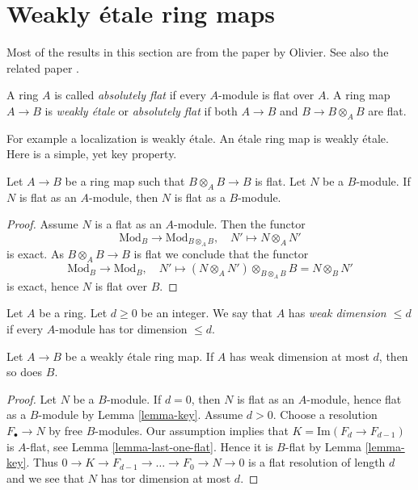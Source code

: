 \section{Weakly \'etale ring maps}
\label{section-weakly-etale}

\noindent
Most of the results in this section are from the paper
\cite{Olivier-AF} by Olivier. See also the related paper
\cite{Ferrand-epi}.

\begin{definition}
\label{definition-weakly-etale}
A ring $A$ is called {\it absolutely flat} if every $A$-module is flat over
$A$. A ring map $A \to B$ is {\it weakly \'etale} or {\it absolutely flat}
if both $A \to B$ and $B \to B \otimes_A B$ are flat.
\end{definition}

\noindent
For example a localization is weakly \'etale. An \'etale ring map is weakly
\'etale. Here is a simple, yet key property.

\begin{lemma}
\label{lemma-key}
Let $A \to B$ be a ring map such that $B \otimes_A B \to B$ is flat.
Let $N$ be a $B$-module. If $N$ is flat as an $A$-module, then
$N$ is flat as a $B$-module.
\end{lemma}

\begin{proof}
Assume $N$ is a flat as an $A$-module.
Then the functor
$$
\text{Mod}_B \longrightarrow \text{Mod}_{B \otimes_A B},\quad
N' \mapsto N \otimes_A N'
$$
is exact. As $B \otimes_A B \to B$ is flat we conclude that the functor
$$
\text{Mod}_B \longrightarrow \text{Mod}_B,\quad
N' \mapsto (N \otimes_A N') \otimes_{B \otimes_A B} B = N \otimes_B N'
$$
is exact, hence $N$ is flat over $B$.
\end{proof}

\begin{definition}
\label{definition-weak-dimension}
Let $A$ be a ring. Let $d \geq 0$ be an integer.
We say that $A$ has {\it weak dimension $\leq d$}
if every $A$-module has tor dimension $\leq d$.
\end{definition}

\begin{lemma}
\label{lemma-weak-dimension-goes-up}
Let $A \to B$ be a weakly \'etale ring map.
If $A$ has weak dimension at most $d$, then so does $B$.
\end{lemma}

\begin{proof}
Let $N$ be a $B$-module. If $d = 0$, then $N$ is flat as an $A$-module,
hence flat as a $B$-module by Lemma \ref{lemma-key}.
Assume $d > 0$. Choose a resolution $F_\bullet \to N$
by free $B$-modules. Our assumption implies that
$K = \text{Im}(F_d \to F_{d - 1})$ is $A$-flat, see
Lemma \ref{lemma-last-one-flat}. Hence it is $B$-flat
by Lemma \ref{lemma-key}. Thus
$0 \to K \to F_{d - 1} \to \ldots \to F_0 \to N \to 0$
is a flat resolution of length $d$ and we see that $N$ has
tor dimension at most $d$.
\end{proof}

